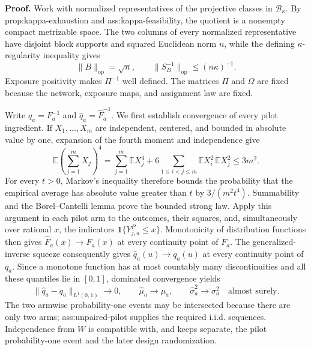 \textbf{Proof.}
Work with normalized representatives of the projective classes in \(\mathcal B_\kappa\).  By prop:kappa-exhaustion and ass:kappa-feasibility, the quotient is a nonempty compact metrizable space.  The two columns of every normalized representative have disjoint block supports and squared Euclidean norm \(n\), while the defining \(\kappa\)-regularity inequality gives
\[
 \lVert B\rVert_{\mathrm{op}}=\sqrt n,
 \qquad
 \lVert S_B^{-1}\rVert_{\mathrm{op}}\le (n\kappa)^{-1}.
 \tag{1}
\]
Exposure positivity makes \(\Pi^{-1}\) well defined.  The matrices \(\Pi\) and \(\Omega\) are fixed because the network, exposure maps, and assignment law are fixed.

Write \(q_a=F_a^{-1}\) and \(\widehat q_a=\widehat F_a^{-1}\).  We first establish convergence of every pilot ingredient.  If \(X_1,\ldots,X_m\) are independent, centered, and bounded in absolute value by one, expansion of the fourth moment and independence give
\[
 \mathbb E\!\left(\sum_{j=1}^m X_j\right)^4
 =\sum_{j=1}^m\mathbb E X_j^4
   +6\sum_{1\le i<j\le m}\mathbb E X_i^2\,\mathbb E X_j^2
 \le 3m^2.
 \tag{2}
\]
For every \(t>0\), Markov's inequality therefore bounds the probability that the empirical average has absolute value greater than \(t\) by \(3/(m^2t^4)\).  Summability and the Borel--Cantelli lemma prove the bounded strong law.  Apply this argument in each pilot arm to the outcomes, their squares, and, simultaneously over rational \(x\), the indicators \(\mathbf 1\{Y^P_{j,a}\le x\}\).  Monotonicity of distribution functions then gives \(\widehat F_a(x)\to F_a(x)\) at every continuity point of \(F_a\).  The generalized-inverse squeeze consequently gives \(\widehat q_a(u)\to q_a(u)\) at every continuity point of \(q_a\).  Since a monotone function has at most countably many discontinuities and all these quantiles lie in \([0,1]\), dominated convergence yields
\[
 \lVert\widehat q_a-q_a\rVert_{L^1(0,1)}\longrightarrow0,
 \qquad
 \widehat\mu_a\longrightarrow\mu_a,
 \qquad
 \widehat\sigma_a^2\longrightarrow\sigma_a^2
 \quad\text{almost surely}.
 \tag{3}
\]
The two armwise probability-one events may be intersected because there are only two arms; ass:unpaired-pilot supplies the required i.i.d. sequences.  Independence from \(W\) is compatible with, and keeps separate, the pilot probability-one event and the later design randomization.

